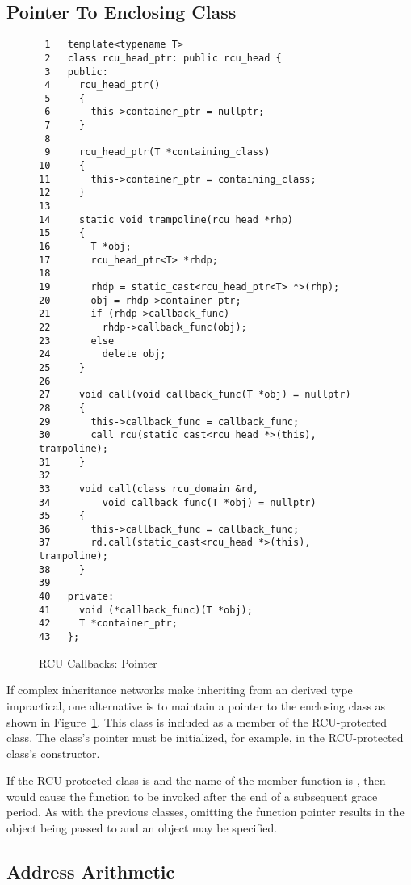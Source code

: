 \documentclass[letterpaper,twocolumn,10pt]{article}
\begin{document}
\subsection{Pointer To Enclosing Class}
\label{sec:Pointer To Enclosing Class}

\begin{figure}[tbp]
{ \scriptsize
\begin{verbatim}
 1   template<typename T>
 2   class rcu_head_ptr: public rcu_head {
 3   public:
 4     rcu_head_ptr()
 5     {
 6       this->container_ptr = nullptr;
 7     }
 8
 9     rcu_head_ptr(T *containing_class)
10     {
11       this->container_ptr = containing_class;
12     }
13
14     static void trampoline(rcu_head *rhp)
15     {
16       T *obj;
17       rcu_head_ptr<T> *rhdp;
18
19       rhdp = static_cast<rcu_head_ptr<T> *>(rhp);
20       obj = rhdp->container_ptr;
21       if (rhdp->callback_func)
22         rhdp->callback_func(obj);
23       else
24         delete obj;
25     }
26
27     void call(void callback_func(T *obj) = nullptr)
28     {
29       this->callback_func = callback_func;
30       call_rcu(static_cast<rcu_head *>(this), trampoline);
31     }
32
33     void call(class rcu_domain &rd,
34         void callback_func(T *obj) = nullptr)
35     {
36       this->callback_func = callback_func;
37       rd.call(static_cast<rcu_head *>(this), trampoline);
38     }
39
40   private:
41     void (*callback_func)(T *obj);
42     T *container_ptr;
43   };
\end{verbatim}
}
\caption{RCU Callbacks: Pointer}
\label{fig:RCU Callbacks: Pointer}
\end{figure}

If complex inheritance networks make inheriting from an
 derived type impractical, one alternative is
to maintain a pointer to the enclosing class as shown in
Figure~\ref{fig:RCU Callbacks: Pointer}.
This  class is included as a member of the RCU-protected
class.
The  class's pointer must be initialized, for example,
in the RCU-protected class's constructor.

If the RCU-protected class is  and the name of the
 member function is , then
 would cause the function  to be
invoked after the end of a subsequent grace period.
As with the previous classes, omitting the function pointer results
in the object being passed to  and an 
object may be specified.

\subsection{Address Arithmetic}
\label{sec:Address Arithmetic}
\end{document}
